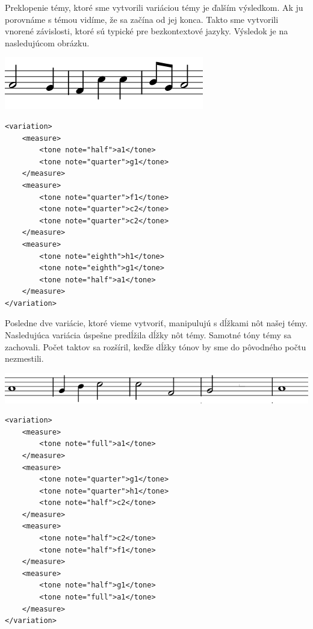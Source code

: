 Preklopenie témy, ktoré sme vytvorili variáciou témy je ďalším výsledkom. Ak ju porovnáme s témou vidíme, že sa začína od jej konca. Takto sme vytvorili vnorené závislosti, ktoré sú typické pre bezkontextové jazyky. Výsledok je na nasledujúcom obrázku.

\begin{minipage}{.45\textwidth}
\includegraphics[width=\textwidth]{thesis/obrazky-figures/var7.png}
\end{minipage}%
\begin{minipage}{.5\textwidth}
\centering
\lstset{language=XML}
\begin{lstlisting}[basicstyle=\tiny]
<variation>
    <measure>
        <tone note="half">a1</tone>
        <tone note="quarter">g1</tone>
    </measure>
    <measure>
        <tone note="quarter">f1</tone>
        <tone note="quarter">c2</tone>
        <tone note="quarter">c2</tone>
    </measure>
    <measure>
        <tone note="eighth">h1</tone>
        <tone note="eighth">g1</tone>
        <tone note="half">a1</tone>
    </measure>
</variation>
\end{lstlisting}
\end{minipage}

Posledne dve variácie, ktoré vieme vytvoriť, manipulujú s dĺžkami nôt našej témy. Nasledujúca variácia úspešne predĺžila dĺžky nôt témy. Samotné tóny témy sa zachovali. Počet taktov sa rozšíril, keďže dĺžky tónov by sme do pôvodného počtu nezmestili.

\begin{minipage}{.46\textwidth}
\includegraphics[width=\textwidth]{thesis/obrazky-figures/var8.png}
\end{minipage}%
\begin{minipage}{.5\textwidth}
\centering
\lstset{language=XML}
\begin{lstlisting}[basicstyle=\tiny]
<variation>
    <measure>
        <tone note="full">a1</tone>
    </measure>
    <measure>
        <tone note="quarter">g1</tone>
        <tone note="quarter">h1</tone>
        <tone note="half">c2</tone>
    </measure>
    <measure>
        <tone note="half">c2</tone>
        <tone note="half">f1</tone>
    </measure>
    <measure>
        <tone note="half">g1</tone>
        <tone note="full">a1</tone>
    </measure>
</variation>
\end{lstlisting}
\end{minipage}

